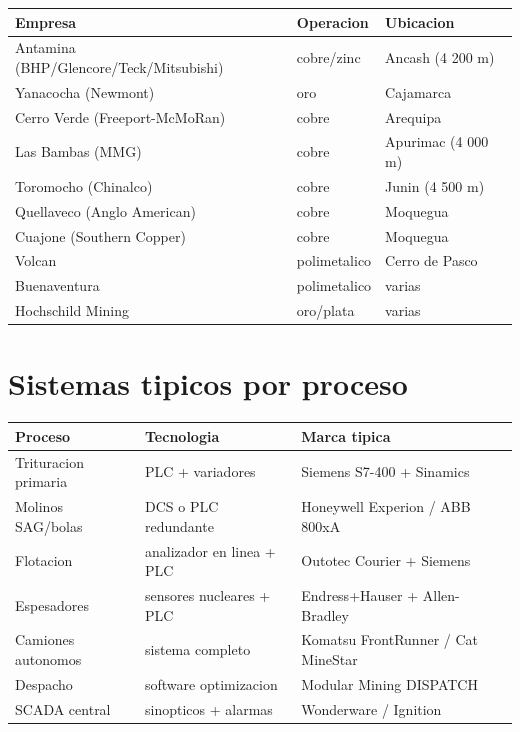 \documentclass[11pt,a4paper,oneside]{report}
\begin{document}
\begin{center}
\begin{tabular}{p{4.5cm}p{4cm}p{4cm}}
\toprule
\textbf{Empresa} & \textbf{Operacion} & \textbf{Ubicacion} \\
\midrule
Antamina (BHP/Glencore/Teck/Mitsubishi)  & cobre/zinc & Ancash (4 200 m) \\
Yanacocha (Newmont)                      & oro        & Cajamarca \\
Cerro Verde (Freeport-McMoRan)           & cobre      & Arequipa \\
Las Bambas (MMG)                         & cobre      & Apurimac (4 000 m) \\
Toromocho (Chinalco)                     & cobre      & Junin (4 500 m) \\
Quellaveco (Anglo American)              & cobre      & Moquegua \\
Cuajone (Southern Copper)                & cobre      & Moquegua \\
Volcan                                   & polimetalico & Cerro de Pasco \\
Buenaventura                             & polimetalico & varias \\
Hochschild Mining                        & oro/plata    & varias \\
\bottomrule
\end{tabular}
\end{center}

\section{Sistemas tipicos por proceso}

\begin{center}
\begin{tabular}{p{3.5cm}p{4.5cm}p{4.5cm}}
\toprule
\textbf{Proceso} & \textbf{Tecnologia} & \textbf{Marca tipica} \\
\midrule
Trituracion primaria & PLC + variadores & Siemens S7-400 + Sinamics \\
Molinos SAG/bolas    & DCS o PLC redundante & Honeywell Experion / ABB 800xA \\
Flotacion            & analizador en linea + PLC & Outotec Courier + Siemens \\
Espesadores          & sensores nucleares + PLC & Endress+Hauser + Allen-Bradley \\
Camiones autonomos   & sistema completo & Komatsu FrontRunner / Cat MineStar \\
Despacho             & software optimizacion & Modular Mining DISPATCH \\
SCADA central        & sinopticos + alarmas & Wonderware / Ignition \\
\bottomrule
\end{tabular}
\end{center}
\end{document}
